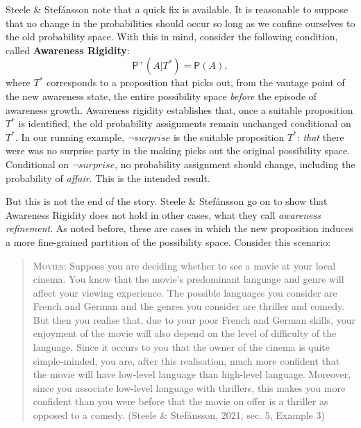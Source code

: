 \documentclass[
  11pt,
  dvipsnames,enabledeprecatedfontcommands]{scrartcl}
\newcommand{\pr}[1]{\ensuremath{\mathsf{P}(#1)}}
\newcommand{\ppr}[2]{\ensuremath{\mathsf{P}^{#1}(#2)}}
\begin{document}
Steele \& Stefánsson note that a quick fix is available. It is
reasonable to suppose that no change in the probabilities should occur
so long as we confine ourselves to the old probability space. With this
in mind, consider the following condition, called
\textbf{Awareness Rigidity}: \[\ppr{+}{A \vert T^*}=\pr{A},\] where
\(T^*\) corresponds to a proposition that picks out, from the vantage
point of the new awareness state, the entire possibility space
\emph{before} the episode of awareness growth. Awareness rigidity
establishes that, once a suitable proposition \(T^*\) is identified, the
old probability assignments remain unchanged conditional on \(T^*\). In
our running example, \(\neg\textit{surprise}\) is the suitable
proposition \(T^*\): \emph{that} there were was no surprise party in the
making picks out the original possibility space. Conditional on
\(\neg\textit{surprise}\), no probability assignment should change,
including the probability of \textit{affair}. This is the intended
result.

But this is not the end of the story. Steele \& Stefánsson go on to show
that Awareness Rigidity does not hold in other cases, what they call
\emph{awareness refinement}. As noted before, these are cases in which
the new proposition induces a more fine-grained partition of the
possibility space. Consider this scenario:

\begin{quote}
\textsc{Movies}: Suppose you are deciding whether to see a movie at your
local cinema. You know that the movie's predominant language and genre
will affect your viewing experience. The possible languages you consider
are French and German and the genres you consider are thriller and
comedy. But then you realise that, due to your poor French and German
skills, your enjoyment of the movie will also depend on the level of
difficulty of the language. Since it occurs to you that the owner of the
cinema is quite simple-minded, you are, after this realisation, much
more confident that the movie will have low-level language than
high-level language. Moreover, since you associate low-level language
with thrillers, this makes you more confident than you were before that
the movie on offer is a thriller as opposed to a comedy. (Steele \&
Stefánsson, 2021, sec. 5, Example 3)
\end{quote}

\doublespace
\end{document}
